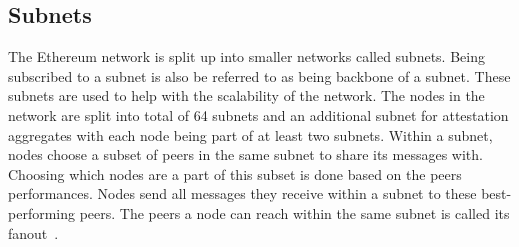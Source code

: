 \subsection{Subnets}\label{subsec:subnets}
The Ethereum network is split up into smaller networks called subnets.
Being subscribed to a subnet is also be referred to as being backbone of a subnet.
These subnets are used to help with the scalability of the network.
The nodes in the network are split into total of 64 subnets and an additional subnet for attestation aggregates with each node being part of at least two subnets.
Within a subnet, nodes choose a subset of peers in the same subnet to share its messages with.
Choosing which nodes are a part of this subset is done based on the peers performances.
Nodes send all messages they receive within a subnet to these best-performing peers.
The peers a node can reach within the same subnet is called its fanout~\cite{heimbach2024deanonymizingethereumvalidatorsp2p}.



%
%

